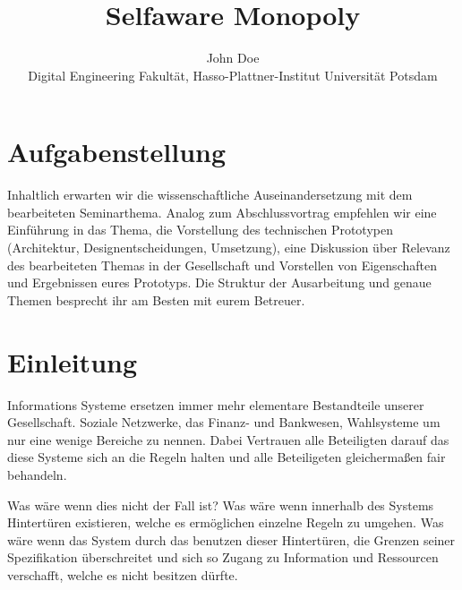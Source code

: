 \documentclass[german]{cgspaper} %
\title{Selfaware Monopoly}
\author{John Doe\\ Digital Engineering Fakultät, Hasso-Plattner-Institut \textbar{} Universität Potsdam}
\begin{document}

\maketitle

\begin{abstract}
\end{abstract}

\copyrightspace %

\section{Aufgabenstellung}
Inhaltlich erwarten wir die wissenschaftliche Auseinandersetzung mit dem bearbeiteten Seminarthema. Analog zum Abschlussvortrag empfehlen wir eine Einführung in das Thema, die Vorstellung des technischen Prototypen (Architektur, Designentscheidungen, Umsetzung), eine Diskussion über Relevanz des bearbeiteten Themas in der Gesellschaft und Vorstellen von Eigenschaften und Ergebnissen eures Prototyps. Die Struktur der Ausarbeitung und genaue Themen besprecht ihr am Besten mit eurem Betreuer.

\section{Einleitung}

Informations Systeme ersetzen immer mehr elementare Bestandteile unserer Gesellschaft.
Soziale Netzwerke, das Finanz- und Bankwesen, Wahlsysteme um nur eine wenige Bereiche zu nennen.
Dabei Vertrauen alle Beteiligten darauf das diese Systeme sich an die Regeln halten und alle Beteiligeten gleichermaßen fair behandeln.

Was wäre wenn dies nicht der Fall ist? 
Was wäre wenn innerhalb des Systems Hintertüren existieren, welche es ermöglichen einzelne Regeln zu umgehen.
Was wäre wenn das System durch das benutzen dieser Hintertüren, die Grenzen seiner Spezifikation überschreitet und sich so Zugang zu Information und Ressourcen verschafft, welche es nicht besitzen dürfte.
\end{document}
